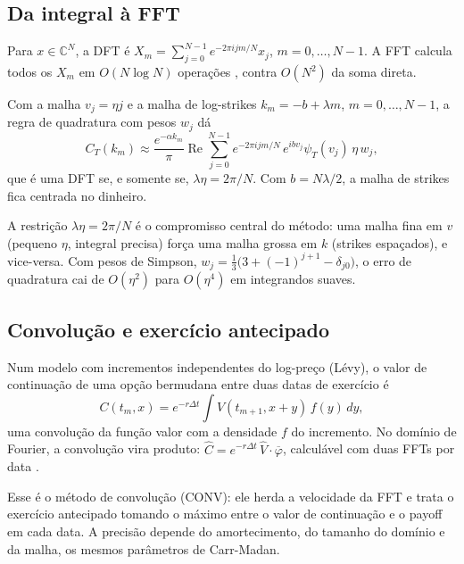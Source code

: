 \subsection{Da integral à FFT}

\begin{definicao}
Para $x\in\mathbb C^N$, a DFT é $X_m=\sum_{j=0}^{N-1}e^{-2\pi ijm/N}x_j$, $m=0,\dots,N-1$. A FFT calcula todos os $X_m$ em $O(N\log N)$ operações \citep{cooleytukey1965}, contra $O(N^2)$ da soma direta.
\end{definicao}

\begin{proposicao}
Com a malha $v_j=\eta j$ e a malha de log-strikes $k_m=-b+\lambda m$, $m=0,\dots,N-1$, a regra de quadratura com pesos $w_j$ dá
\begin{equation}
C_T(k_m)\approx\frac{e^{-\alpha k_m}}{\pi}\operatorname{Re}\sum_{j=0}^{N-1}e^{-2\pi ijm/N}\,e^{ibv_j}\psi_T(v_j)\,\eta\,w_j,
\end{equation}
que é uma DFT se, e somente se, $\lambda\eta=2\pi/N$. Com $b=N\lambda/2$, a malha de strikes fica centrada no dinheiro.
\end{proposicao}

A restrição $\lambda\eta=2\pi/N$ é o compromisso central do método: uma malha fina em $v$ (pequeno $\eta$, integral precisa) força uma malha grossa em $k$ (strikes espaçados), e vice-versa. Com pesos de Simpson, $w_j=\tfrac13\big(3+(-1)^{j+1}-\delta_{j0}\big)$, o erro de quadratura cai de $O(\eta^2)$ para $O(\eta^4)$ em integrandos suaves.

\subsection{Convolução e exercício antecipado}

\begin{proposicao}
Num modelo com incrementos independentes do log-preço (Lévy), o valor de continuação de uma opção bermudana entre duas datas de exercício é
\begin{equation}
C(t_m,x)=e^{-r\Delta t}\int V(t_{m+1},x+y)\,f(y)\,dy,
\end{equation}
uma convolução da função valor com a densidade $f$ do incremento. No domínio de Fourier, a convolução vira produto: $\widehat C=e^{-r\Delta t}\,\widehat V\cdot\overline{\varphi}$, calculável com duas FFTs por data \citep{lordetal2008}.
\end{proposicao}

Esse é o método de convolução (CONV): ele herda a velocidade da FFT e trata o exercício antecipado tomando o máximo entre o valor de continuação e o payoff em cada data. A precisão depende do amortecimento, do tamanho do domínio e da malha, os mesmos parâmetros de Carr-Madan.
